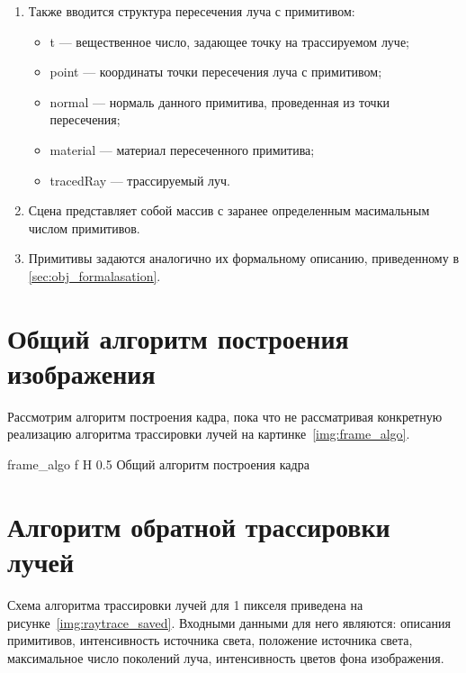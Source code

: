 \begin{enumerate}
	
	
	\item  Также вводится структура пересечения луча с примитивом:
	\begin{itemize}
		\item t --- вещественное число, задающее точку на трассируемом луче;
		\item point --- координаты точки пересечения луча с примитивом;
		\item normal --- нормаль данного примитива, проведенная из точки пересечения;
		\item material --- материал пересеченного примитива;
		\item tracedRay --- трассируемый луч.
	\end{itemize}
	
	\item Сцена представляет собой массив с заранее определенным масимальным числом примитивов.
	\item Примитивы задаются аналогично их формальному описанию, приведенному в \ref{sec:obj_formalasation}.
\end{enumerate}

\section{Общий алгоритм построения изображения}
Рассмотрим алгоритм построения кадра, пока что не рассматривая конкретную реализацию алгоритма трассировки лучей на картинке~\ref{img:frame_algo}.




{frame_algo} %
{f} %
{H} %
{0.5\textwidth} %
{Общий алгоритм построения кадра} %







\section{Алгоритм обратной трассировки лучей}
Схема алгоритма трассировки лучей для 1 пикселя приведена на рисунке~\ref{img:raytrace_saved}. Входными данными для него являются: описания примитивов,
интенсивность источника света, положение источника света, максимальное число поколений луча, интенсивность цветов фона изображения.


